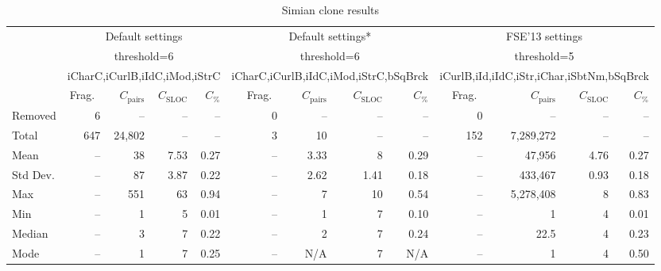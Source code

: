 \documentclass{IEEEtran}
\begin{document}
\begin{table}[h]
	\centering
	\caption{Simian clone results}
	\label{t_simian_raw_results}
	\begin{tabular}{l|r|r|r|r|r|r|r|r|r|r|r|r}
		\hline
		\multirow{4}{*}{} 
		& \multicolumn{4}{c|}{Default settings} 
		& \multicolumn{4}{c|}{Default settings*} 
		& \multicolumn{4}{c}{FSE'13 settings} \\ \cline{2-13} %
		& \multicolumn{4}{c|}{threshold=6} 
		& \multicolumn{4}{c|}{threshold=6} 
		& \multicolumn{4}{c}{threshold=5}  \\  %
		& \multicolumn{4}{c|}{iCharC,iCurlB,iIdC,iMod,iStrC} &
		\multicolumn{4}{c|}{iCharC,iCurlB,iIdC,iMod,iStrC,bSqBrck} & \multicolumn{4}{c}{iCurlB,iId,iIdC,iStr,iChar,iSbtNm,bSqBrck} \\\cline{2-13}  %
		& Frag.~ & $C_{\mathrm{pairs}}$ & $C_{\mathrm{SLOC}}$ & $C_{\mathrm{\%}}$ 
		& Frag.~ & $C_{\mathrm{pairs}}$ & $C_{\mathrm{SLOC}}$ & $C_{\mathrm{\%}}$ 
		& Frag.~ & $C_{\mathrm{pairs}}$ & $C_{\mathrm{SLOC}}$ & $C_{\mathrm{\%}}$ \\ %
		\hline
		Removed & 6 & -- & -- & -- & 0 & -- & -- & -- & 0 & -- & -- & -- \\ %
		Total          & 647       & 24,802       & --         & --  & 3   & 10 & -- & -- &  152 & 7,289,272 & -- & --  \\ %
		Mean           & --        & 38           & 7.53       & 0.27   & -- & 3.33 & 8 & 0.29 & -- & 47,956 & 4.76 & 0.27 \\ %
		Std Dev.       & -- 		  & 87		& 3.87 & 0.22 & -- & 2.62 & 1.41 & 0.18 & -- & 433,467 & 0.93 & 0.18 \\ %
		Max            & --       & 551         & 63          & 0.94  & -- & 7	& 10 & 0.54 & -- & 5,278,408 & 8 & 0.83 \\ %
		Min            & --       & 1           & 5           & 0.01  & -- & 1 & 7 & 0.10 & -- & 1 & 4 & 0.01 \\ %
		Median         & --       & 3           & 7           & 0.22  & -- & 2 & 7 & 0.24 & -- & 22.5 & 4 & 0.23 \\ %
		Mode           & --       & 1           & 7           & 0.25  & -- & N/A & 7 & N/A & -- & 1 & 4 & 0.50 \\ %
		\hline
	\end{tabular} 
\end{table}
\end{document}
